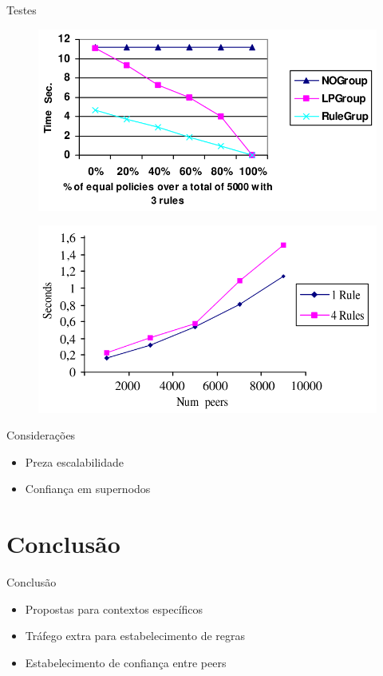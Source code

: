 \documentclass{beamer}
\begin{document}
  \begin{frame}{Testes}
  \begin{multicols}{2}
    \begin{figure}[H]
     \includegraphics[scale=0.2]{phera_fig3.png}
    \end{figure}
    \begin{figure}[H]
     \includegraphics[scale=0.2]{phera_fig4.png}
    \end{figure}
  \end{multicols}
  \end{frame}
  
  
  \begin{frame}{Considerações}
   \begin{itemize}
    \item Preza escalabilidade
    \item Confiança em supernodos
   \end{itemize}
   

  \end{frame}






\section{Conclusão}
  \begin{frame}{Conclusão}
    \begin{itemize}
     \item Propostas para contextos específicos
     \item Tráfego extra para estabelecimento de regras
     \item Estabelecimento de confiança entre peers
    \end{itemize}

  \end{frame}
\end{document}
